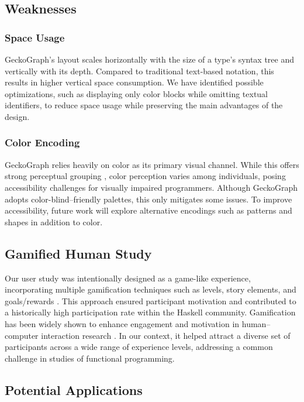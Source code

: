 \documentclass[preprint,12pt]{elsarticle}
\begin{document}
\subsection{Weaknesses}\label{sec:discussion:weaknesses}
\subsubsection{Space Usage}\label{subsec:space}
GeckoGraph’s layout scales horizontally with the size of a type’s syntax tree and vertically with its depth. 
Compared to traditional text-based notation, this results in higher vertical space consumption. 
We have identified possible optimizations, such as displaying only color blocks while omitting textual identifiers, to reduce space usage while preserving the main advantages of the design.

\subsubsection{Color Encoding}
GeckoGraph relies heavily on color as its primary visual channel. 
While this offers strong perceptual grouping \cite{Zeng2023-jz}, color perception varies among individuals, posing accessibility challenges for visually impaired programmers. 
Although GeckoGraph adopts color-blind–friendly palettes, this only mitigates some issues. 
To improve accessibility, future work will explore alternative encodings such as patterns and shapes in addition to color.

\subsection{Gamified Human Study}\label{sec:discussion:gamification}
Our user study was intentionally designed as a game-like experience, incorporating multiple gamification techniques such as levels, story elements, and goals/rewards \cite{Hamari2014-mc}. 
This approach ensured participant motivation and contributed to a historically high participation rate within the Haskell community. 
Gamification has been widely shown to enhance engagement and motivation in human–computer interaction research \cite{He2014-vp}. 
In our context, it helped attract a diverse set of participants across a wide range of experience levels, addressing a common challenge in studies of functional programming.

\subsection{Potential Applications}\label{sec:discussion:applications}
\end{document}
